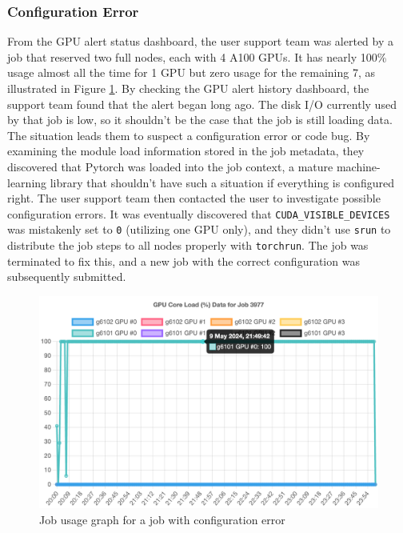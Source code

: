 \subsubsection{Configuration Error}
From the GPU alert status dashboard, the user support team was alerted by a job that reserved two full nodes, each with 4 A100 GPUs. It has nearly 100\% usage almost all the time for 1 GPU but zero usage for the remaining 7, as illustrated in Figure \ref{fig_job_config_error}. By checking the GPU alert history dashboard, the support team found that the alert began long ago. The disk I/O currently used by that job is low, so it shouldn't be the case that the job is still loading data. The situation leads them to suspect a configuration error or code bug. By examining the module load information stored in the job metadata, they discovered that Pytorch was loaded into the job context, a mature machine-learning library that shouldn't have such a situation if everything is configured right. The user support team then contacted the user to investigate possible configuration errors. It was eventually discovered that \texttt{CUDA\_VISIBLE\_DEVICES} was mistakenly set to \texttt{0} (utilizing one GPU only), and they didn't use \texttt{srun} to distribute the job steps to all nodes properly with \texttt{torchrun}. The job was terminated to fix this, and a new job with the correct configuration was subsequently submitted.

\begin{figure}[H]
    \centering
    \includegraphics[width=1\textwidth]{figures/job-config-error.png}
    \caption{Job usage graph for a job with configuration error}
    \label{fig_job_config_error}
\end{figure}

